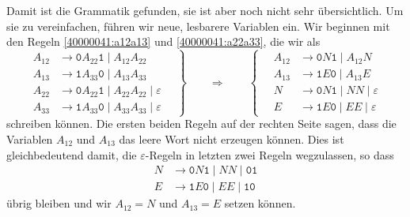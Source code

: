 \begin{loesung}
Damit ist die Grammatik gefunden, sie ist aber noch nicht sehr übersichtlich.
Um sie zu vereinfachen, führen wir neue, lesbarere Variablen ein.
Wir beginnen mit den Regeln \eqref{40000041:a12a13} und \eqref{40000041:a22a33},
die wir als
\[
\left.
\begin{aligned}
A_{12}&\to\texttt{0} A_{22}\texttt{1} \mid  A_{12}A_{22}\\
A_{13}&\to\texttt{1} A_{33}\texttt{0} \mid  A_{13}A_{33}\\
A_{22}&\to \texttt{0}A_{22}\texttt{1} \mid  A_{22}A_{22} \mid  \varepsilon\\
A_{33}&\to \texttt{1}A_{33}\texttt{0} \mid  A_{33}A_{33} \mid  \varepsilon
\end{aligned}
\quad
\right\}
\qquad\Rightarrow\qquad
\left\{
\quad
\begin{aligned}
A_{12}&\to\texttt{0} N\texttt{1} \mid  A_{12}N \\
A_{13}&\to\texttt{1} E\texttt{0} \mid  A_{13}E \\
N &\to \texttt{0} N \texttt{1} \mid  NN \mid  \varepsilon\\
E &\to \texttt{1} E \texttt{0} \mid  EE \mid  \varepsilon
\end{aligned}
\right.
\]
schreiben können.
Die ersten beiden Regeln auf der rechten Seite sagen, dass die Variablen
$A_{12}$ und $A_{13}$ das leere Wort nicht erzeugen können.
Dies ist gleichbedeutend damit, die $\varepsilon$-Regeln in letzten zwei 
Regeln wegzulassen, so dass 
\begin{equation}
\begin{aligned}
N &\to \texttt{0} N \texttt{1} \mid  NN \mid  \texttt{01}\\
E &\to \texttt{1} E \texttt{0} \mid  EE \mid  \texttt{10}
\end{aligned}
\label{40000041:NE}
\end{equation}
übrig bleiben und wir $A_{12}=N$ und $A_{13}=E$ setzen können.


\end{loesung}
